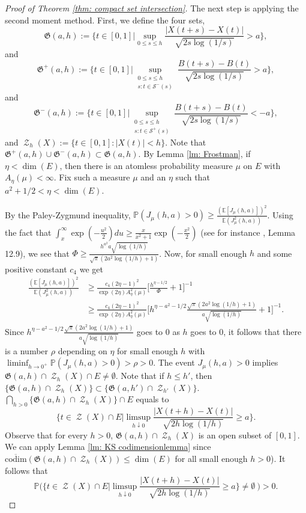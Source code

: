 \documentclass[11pt, reqno]{amsart}
\theoremstyle{plain}
\theoremstyle{definition}
\theoremstyle{remark}
\begin{document}
\begin{proof}[Proof of Theorem \ref{thm: compact set intersection}]
The next step is applying the second moment method. First, we define the four sets,
\[
 {\mathfrak{G}} (a,h) := \Big\{ t\in[0,1] \Big| \sup_{0\leq s\leq h} \frac{|X(t+s)-X(t)|}{\sqrt{2s\log{(1/s)}}} > a  \Big\},
\]
and
\[
 {\mathfrak{G}}^+ (a,h) := \Big\{ t\in [0,1] \Big| \sup_{\substack{0\leq s\leq h \\ s: t\in {\mathcal{S}}^-(s)}} \frac{B(t+s)-B(t)}{\sqrt{2s\log{(1/s)}}} > a  \Big\},
\]
and
\[
 {\mathfrak{G}}^- (a,h) := \Big\{ t\in[0,1] \Big| \sup_{\substack{0\leq s\leq h \\ s: t\in {\mathcal{S}}^+(s)}} \frac{B(t+s)-B(t)}{\sqrt{2s\log{(1/s)}}} < -a  \Big\},
\]
and $\operatorname{\mathcal{Z}}_h(X):=\{t\in[0,1]: |X(t)| < h\}$.
Note that ${\mathfrak{G}}^+ (a,h) \cup {\mathfrak{G}}^- (a,h) \subset {\mathfrak{G}} (a,h)$. 
By Lemma \ref{lm: Frostman}, if $\eta< \dim(E)$, then there is an atomless probability measure $\mu$ on $E$ with $A_\eta(\mu)<\infty$. Fix such a measure $\mu$ and an $\eta$ such that $a^2+1/2<\eta<\dim(E)$.

By the Paley-Zygmund inequality, $\mathbb{P}(J_{\mu}(h,a)>0)  \geq \frac{(\mathbb{E} [J_{\mu}(h,a)])^2} {\mathbb{E} (J^2_{\mu}(h,a))}$.
Using the fact that $\int_x^{\infty} \exp{(-\frac{u^2}{2})} du \geq \frac{x}{x^2 + 1}\exp{(-\frac{x^2}{2})}$ (see for instance \cite{MP}, Lemma 12.9), we see that $\Phi \geq \frac{h^{a^2}a\sqrt{\log(1/h)}}{{\sqrt{\pi}}(2a^2\log(1/h)+1)}$.
Now, for small enough $h$ and some positive constant $c_4$ we get
\begin{align*}
\frac{(\mathbb{E} [J_{\mu}(h,a)])^2} {\mathbb{E} (J^2_{\mu}(h,a))} &\geq \frac{c_4 (2\eta-1)^2}{\exp(2\eta) A_\eta^2(\mu)}\Big[\frac{h^{\eta -1/2}}{\Phi} + 1\Big]^{-1}\\
&\geq \frac{c_4 (2\eta-1)^2}{\exp(2\eta) A_\eta^2(\mu)}\Big[h^{\eta-a^2 -1/2}\frac{\sqrt{\pi}(2a^2\log(1/h)+1)}{a\sqrt{\log(1/h)}} + 1\Big]^{-1}.
\end{align*}
Since $h^{\eta-a^2 -1/2}\frac{\sqrt{\pi}(2a^2\log(1/h)+1)}{a\sqrt{\log(1/h)}}$ goes to $0$ as $h$ goes to $0$, it follows that there is a number $\rho$ depending on $\eta$ for small enough $h$ with $\liminf_{h\rightarrow0^+}\mathbb{P}({J}_{\mu}(h,a)>0)> \rho >0$. The event ${J}_{\mu}(h,a)>0$ implies ${\mathfrak{G}} (a,h) \cap \operatorname{\mathcal{Z}}_h(X) \cap E \neq \emptyset$.
Note that if $h\leq h'$, then $\{{\mathfrak{G}} (a,h) \cap \operatorname{\mathcal{Z}}_h(X)\} \subset \{{\mathfrak{G}} (a,h') \cap \operatorname{\mathcal{Z}}_{h'}(X)\}$. $\bigcap_{h>0}\{{\mathfrak{G}} (a,h) \cap \operatorname{\mathcal{Z}}_h(X)\} \cap E$ equals to
$$\Big\{ t\in\operatorname{\mathcal{Z}}(X) \cap E  \Big| \limsup_{h \downarrow 0} \frac{|X(t+h)-X(t)|}{\sqrt{2h\log{(1/h)}}} \geq a  \Big\}.$$
Observe that for every $h>0$, ${\mathfrak{G}} (a,h) \cap \operatorname{\mathcal{Z}}_h(X)$ is an open subset of $[0,1]$. We can apply Lemma \ref{lm: KS codimensionlemma} since $\overline{\mathrm{codim}}({\mathfrak{G}} (a,h) \cap \operatorname{\mathcal{Z}}_h(X)) \leq \dim (E)$ for all small enough $h>0$).
It follows 
 that
$${\mathbb{P}}\Big( \Big\{ t\in\operatorname{\mathcal{Z}}(X)\cap E  \Big| \limsup_{h \downarrow 0} \frac{|X(t+h)-X(t)|}{\sqrt{2h\log{(1/h)}}} \geq a  \Big\}\neq \emptyset\ \Big) > 0.$$


\end{proof}
\end{document}

